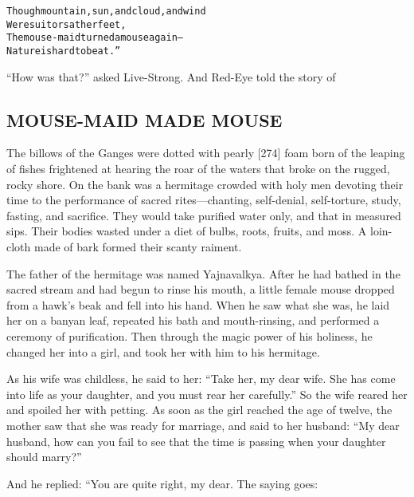 \documentclass{article}
\renewenvironment{verbatim}{\begin{alltt}\normalfont\begin{centering}}{\end{centering}\end{alltt}}
\begin{document}
\begin{verbatim}
Though mountain, sun, and cloud, and wind
    Were suitors at her feet,
The mouse-maid turned a mouse again--
    Nature is hard to beat.”
\end{verbatim}
``How was that?'' asked Live-Strong. And Red-Eye told the story of

\subsection{MOUSE-MAID MADE MOUSE}

The billows of the Ganges were dotted with pearly [274] foam born
of the leaping of fishes frightened at hearing the roar of the
waters that broke on the rugged, rocky shore. On the bank was a
hermitage crowded with holy men devoting their time to the
performance of sacred rites---chanting, self-denial, self-torture,
study, fasting, and sacrifice. They would take purified water only,
and that in measured sips. Their bodies wasted under a diet of
bulbs, roots, fruits, and moss. A loin-cloth made of bark formed
their scanty raiment.

The father of the hermitage was named Yajnavalkya. After he had
bathed in the sacred stream and had begun to rinse his mouth, a
little female mouse dropped from a hawk's beak and fell into his
hand. When he saw what she was, he laid her on a banyan leaf,
repeated his bath and mouth-rinsing, and performed a ceremony of
purification. Then through the magic power of his holiness, he
changed her into a girl, and took her with him to his hermitage.

As his wife was childless, he said to her:
``Take her, my dear wife. She has come into life as your daughter, and you must rear her carefully.''
So the wife reared her and spoiled her with petting. As soon as the
girl reached the age of twelve, the mother saw that she was ready
for marriage, and said to her husband:
``My dear husband, how can you fail to see that the time is passing when your daughter should marry?''

And he replied: “You are quite right, my dear. The saying goes:
\end{document}
